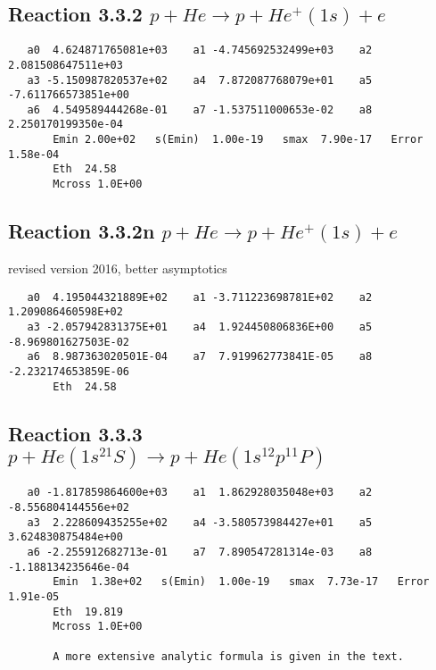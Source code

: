 \documentclass[12pt,dvipdfm]{article}
\begin{document}
\newpage
\subsection{
Reaction 3.3.2 $    p + He \rightarrow p + He^+(1s) + e$}


\begin{small}\begin{verbatim}
   a0  4.624871765081e+03    a1 -4.745692532499e+03    a2  2.081508647511e+03
   a3 -5.150987820537e+02    a4  7.872087768079e+01    a5 -7.611766573851e+00
   a6  4.549589444268e-01    a7 -1.537511000653e-02    a8  2.250170199350e-04
       Emin 2.00e+02   s(Emin)  1.00e-19   smax  7.90e-17   Error 1.58e-04
       Eth  24.58
       Mcross 1.0E+00
\end{verbatim}\end{small}


\subsection{
Reaction 3.3.2n $    p + He \rightarrow p + He^+(1s) + e$}
revised version 2016,  better asymptotics

\begin{small}\begin{verbatim}
   a0  4.195044321889E+02    a1 -3.711223698781E+02    a2  1.209086460598E+02
   a3 -2.057942831375E+01    a4  1.924450806836E+00    a5 -8.969801627503E-02
   a6  8.987363020501E-04    a7  7.919962773841E-05    a8 -2.232174653859E-06
       Eth  24.58

\end{verbatim}\end{small}


\newpage
\subsection{
Reaction 3.3.3 $p + He(1s^21S) \rightarrow p + He(1s^12p^11P)$}















\begin{small}\begin{verbatim}
   a0 -1.817859864600e+03    a1  1.862928035048e+03    a2 -8.556804144556e+02
   a3  2.228609435255e+02    a4 -3.580573984427e+01    a5  3.624830875484e+00
   a6 -2.255912682713e-01    a7  7.890547281314e-03    a8 -1.188134235646e-04
       Emin  1.38e+02   s(Emin)  1.00e-19   smax  7.73e-17   Error  1.91e-05
       Eth  19.819
       Mcross 1.0E+00

       A more extensive analytic formula is given in the text.
\end{verbatim}\end{small}
\end{document}
